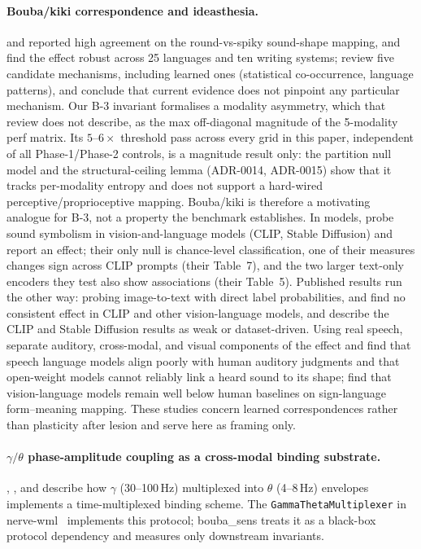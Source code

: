 \documentclass{article}
\begin{document}
\paragraph{Bouba/kiki correspondence and ideasthesia.}
\citet{kohler1947gestalt} and
\citet{ramachandran2001synaesthesia} reported high agreement on the
round-vs-spiky sound-shape mapping, and \citet{cwiek2022bouba} find
the effect robust across 25 languages and ten writing systems;
\citet{sidhu2018five} review five candidate mechanisms, including
learned ones (statistical co-occurrence, language patterns), and
conclude that current evidence does not pinpoint any particular
mechanism. Our B-3 invariant formalises a modality asymmetry, which
that review does not describe, as the max
off-diagonal magnitude of the 5-modality perf matrix. Its
$5$--$6\times$ threshold pass across every grid in this paper,
independent of all Phase-1/Phase-2 controls, is a magnitude result
only: the partition null model and the structural-ceiling lemma
(ADR-0014, ADR-0015) show that it tracks per-modality entropy and
does not support a hard-wired perceptive/proprioceptive mapping.
Bouba/kiki is therefore a motivating analogue for B-3, not a
property the benchmark establishes. In models,
\citet{alper2023kiki} probe sound symbolism in vision-and-language
models (CLIP, Stable Diffusion) and report an effect; their only null
is chance-level classification, one of their measures changes sign
across CLIP prompts (their Table~7), and the two larger text-only
encoders they test also show associations (their Table~5). Published results run the other way:
probing image-to-text with direct label probabilities,
\citet{verhoef2024kiki} and \citet{kouwenhoven2025bouba} find no
consistent effect in CLIP and other vision-language models, and
\citet{keles2026iconicity} describe the CLIP and Stable Diffusion
results as weak or dataset-driven. Using real speech,
\citet{tsai2026hearing} separate auditory, cross-modal, and visual
components of the effect and find that speech language models align
poorly with human auditory judgments and that open-weight models
cannot reliably link a heard sound to its shape;
\citet{keles2026iconicity} find that vision-language models remain
well below human baselines on sign-language form--meaning mapping.
These studies concern learned correspondences rather than
plasticity after lesion and serve here as framing only.

\paragraph{$\gamma/\theta$ phase-amplitude coupling as a cross-modal binding substrate.}
\citet{lisman1995storage}, \citet{tort2010measuring}, and
\citet{colgin2016rhythms} describe how $\gamma$ (30--100\,Hz)
multiplexed into $\theta$ (4--8\,Hz) envelopes implements a
time-multiplexed binding scheme. The
\texttt{GammaThetaMultiplexer} in
nerve-wml~\citep{saillant2026nervewml} implements this protocol;
bouba\_sens treats it as a black-box protocol dependency and
measures only downstream invariants.
\end{document}
